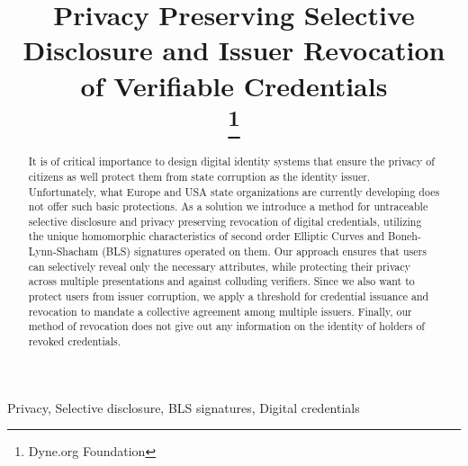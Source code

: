 \documentclass[conference]{IEEEtran}
\begin{document}
\title{Privacy Preserving Selective Disclosure and Issuer Revocation of Verifiable Credentials\\
\thanks{Dyne.org Foundation}
}

\author{
\and
{}
}

\maketitle

\begin{abstract}

It is of critical importance to design digital identity systems that
ensure the privacy of citizens as well protect them from state
corruption as the identity issuer. Unfortunately, what Europe and USA
state organizations are currently developing does not offer such basic
protections. As a solution we introduce a method for untraceable
selective disclosure and privacy preserving revocation of digital
credentials, utilizing the unique homomorphic characteristics of
second order Elliptic Curves and Boneh-Lynn-Shacham (BLS) signatures
operated on them. Our approach ensures that users can selectively
reveal only the necessary attributes, while protecting their privacy
across multiple presentations and against colluding verifiers. Since
we also want to protect users from issuer corruption, we apply a
threshold for credential issuance and revocation to mandate a
collective agreement among multiple issuers. Finally, our method of
revocation does not give out any information on the identity of
holders of revoked credentials.

\end{abstract}

\begin{IEEEkeywords}
Privacy, Selective disclosure, BLS signatures, Digital credentials
\end{IEEEkeywords}
\end{document}
